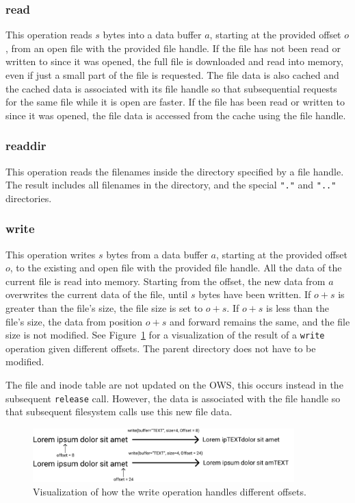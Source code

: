 \subsubsection{read}
This operation reads $s$ bytes into a data buffer $a$, starting at the provided offset $o$, from an open file with the provided file handle. If the file has not been read or written to since it was opened, the full file is downloaded and read into memory, even if just a small part of the file is requested. The file data is also cached and the cached data is associated with its file handle so that subsequential requests for the same file while it is open are faster. If the file has been read or written to since it was opened, the file data is accessed from the cache using the file handle.

\subsubsection{readdir}
This operation reads the filenames inside the directory specified by a file handle. The result includes all filenames in the directory, and the special \texttt{"."} and \texttt{".."} directories.

\subsubsection{write}
This operation writes $s$ bytes from a data buffer $a$, starting at the provided offset $o$, to the existing and open file with the provided file handle. All the data of the current file is read into memory. Starting from the offset, the new data from $a$ overwrites the current data of the file, until $s$ bytes have been written. If $o + s$ is greater than the file's size, the file size is set to $o + s$. If $o + s$ is less than the file's size, the data from position $o + s$ and forward remains the same, and the file size is not modified. See Figure~\ref{fig:write_flow} for a visualization of the result of a \texttt{write} operation given different offsets. The parent directory does not have to be modified. 

The file and inode table are not updated on the \gls{OWS}, this occurs instead in the subsequent \texttt{release} call. However, the data is associated with the file handle so that subsequent filesystem calls use this new file data.

\begin{figure}[!ht]
	\begin{center}
	  \includegraphics[width=0.9\textwidth]{figures.nosync/write_flow.png}
	\end{center}
	\caption{Visualization of how the write operation handles different offsets.}
	\label{fig:write_flow}
\end{figure}

